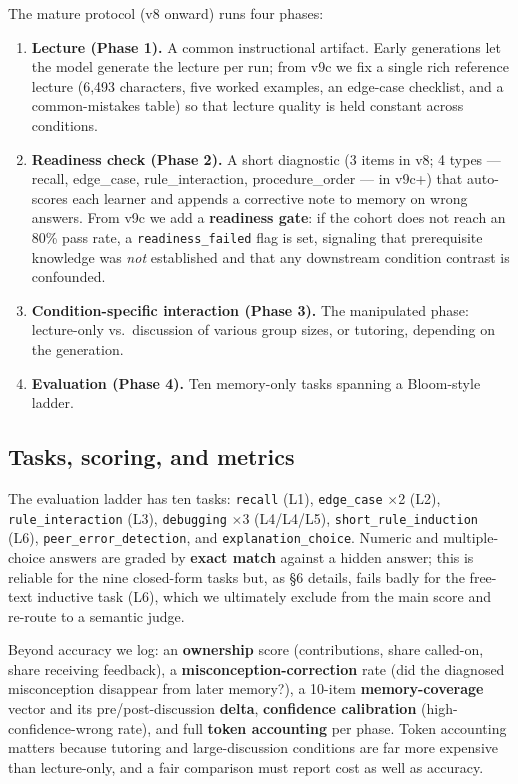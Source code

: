 \documentclass[11pt]{article}
\begin{document}
The mature protocol (v8 onward) runs four phases:
\begin{enumerate}
  \item \textbf{Lecture (Phase 1).}  A common instructional artifact.  Early
    generations let the model generate the lecture per run; from v9c we fix a single
    rich reference lecture (6,493 characters, five worked examples, an edge-case
    checklist, and a common-mistakes table) so that lecture quality is held constant
    across conditions.
  \item \textbf{Readiness check (Phase 2).}  A short diagnostic (3 items in v8; 4
    types --- recall, edge\_case, rule\_interaction, procedure\_order --- in v9c+)
    that auto-scores each learner and appends a corrective note to memory on wrong
    answers.  From v9c we add a \textbf{readiness gate}: if the cohort does not reach
    an 80\% pass rate, a \texttt{readiness\_failed} flag is set, signaling that
    prerequisite knowledge was \emph{not} established and that any downstream
    condition contrast is confounded.
  \item \textbf{Condition-specific interaction (Phase 3).}  The manipulated phase:
    lecture-only vs.\ discussion of various group sizes, or tutoring, depending on
    the generation.
  \item \textbf{Evaluation (Phase 4).}  Ten memory-only tasks spanning a Bloom-style
    ladder.
\end{enumerate}

\subsection{Tasks, scoring, and metrics}

The evaluation ladder has ten tasks: \texttt{recall} (L1), \texttt{edge\_case}
$\times$2 (L2), \texttt{rule\_interaction} (L3), \texttt{debugging} $\times$3
(L4/L4/L5), \texttt{short\_rule\_induction} (L6), \texttt{peer\_error\_detection},
and \texttt{explanation\_choice}.  Numeric and multiple-choice answers are graded by
\textbf{exact match} against a hidden answer; this is reliable for the nine
closed-form tasks but, as \S6 details, fails badly for the free-text inductive task
(L6), which we ultimately exclude from the main score and re-route to a semantic
judge.

Beyond accuracy we log: an \textbf{ownership} score (contributions, share called-on,
share receiving feedback), a \textbf{misconception-correction} rate (did the
diagnosed misconception disappear from later memory?), a 10-item
\textbf{memory-coverage} vector and its pre/post-discussion \textbf{delta},
\textbf{confidence calibration} (high-confidence-wrong rate), and full \textbf{token
accounting} per phase.  Token accounting matters because tutoring and large-discussion
conditions are far more expensive than lecture-only, and a fair comparison must report
cost as well as accuracy.
\end{document}
